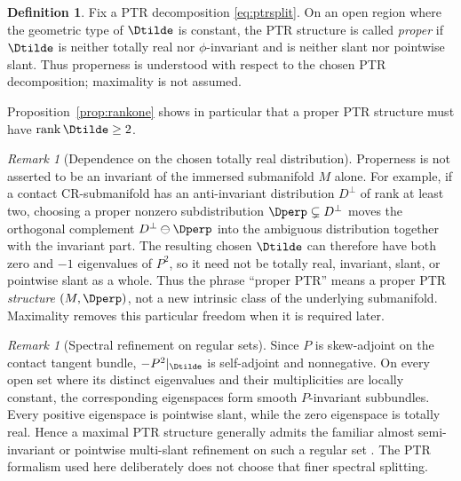 \documentclass[11pt]{article}
\theoremstyle{definition}\newtheorem{definition}[theorem]{Definition}\newtheorem{example}[theorem]{Example}
\theoremstyle{remark}\newtheorem{remark}[theorem]{Remark}
\begin{document}
\begin{definition}\label{def:proper}
Fix a PTR decomposition \eqref{eq:ptrsplit}.  On an open region where the
geometric type of \(\Dtilde\) is constant, the PTR structure is called
\emph{proper} if \(\Dtilde\) is neither totally real nor
\(\phi\)-invariant and is neither slant nor pointwise slant.
Thus properness is understood with respect to the chosen PTR
decomposition; maximality is not assumed.
\end{definition}

Proposition~\ref{prop:rankone} shows in particular that a proper PTR structure must have \(\operatorname{rank}\Dtilde\ge2\).

\begin{remark}[Dependence on the chosen totally real distribution]
\label{rem:choice-dependence}
Properness is not asserted to be an invariant of the immersed submanifold
\(M\) alone.  For example, if a contact CR-submanifold has an
anti-invariant distribution \(D^\perp\) of rank at least two, choosing a
proper nonzero subdistribution
\(\Dperp\subsetneq D^\perp\) moves the orthogonal complement
\(D^\perp\ominus\Dperp\) into the ambiguous distribution together with
the invariant part.  The resulting chosen \(\Dtilde\) can therefore have
both zero and \(-1\) eigenvalues of \(P^2\), so it need not be totally
real, invariant, slant, or pointwise slant as a whole.  Thus the phrase
``proper PTR'' means a proper PTR \emph{structure} \((M,\Dperp)\), not a
new intrinsic class of the underlying submanifold.  Maximality removes
this particular freedom when it is required later.
\end{remark}

\begin{remark}[Spectral refinement on regular sets]
\label{rem:spectral-refinement}
Since \(P\) is skew-adjoint on the contact tangent bundle,
\(-P^2|_{\Dtilde}\) is self-adjoint and nonnegative.  On every open set
where its distinct eigenvalues and their multiplicities are locally
constant, the corresponding eigenspaces form smooth \(P\)-invariant
subbundles.  Every positive eigenspace is pointwise slant, while the zero
eigenspace is totally real.  Hence a maximal PTR structure generally
admits the familiar almost semi-invariant or pointwise multi-slant
refinement on such a regular set
\cite{BejancuPapaghiuc1984ASI,Papaghiuc1984Results,PrasadVerma2021}.
The PTR formalism used here deliberately does not choose that finer
spectral splitting.
\end{remark}
\end{document}
